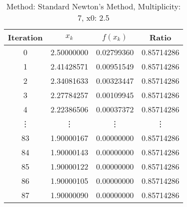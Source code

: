 \begin{table}
\centering
\caption{Method: Standard Newton's Method, Multiplicity: 7, x0: 2.5}
\label{tab:table_Standard_Newton's_Method_7_2_5}
\begin{tabular}{c c c c}
\toprule
Iteration &      $x_k$ &   $f(x_k)$ &      Ratio \\
\midrule
        0 & 2.50000000 & 0.02799360 & 0.85714286 \\
        1 & 2.41428571 & 0.00951549 & 0.85714286 \\
        2 & 2.34081633 & 0.00323447 & 0.85714286 \\
        3 & 2.27784257 & 0.00109945 & 0.85714286 \\
        4 & 2.22386506 & 0.00037372 & 0.85714286 \\
   \vdots &     \vdots &     \vdots &     \vdots \\
       83 & 1.90000167 & 0.00000000 & 0.85714286 \\
       84 & 1.90000143 & 0.00000000 & 0.85714286 \\
       85 & 1.90000122 & 0.00000000 & 0.85714286 \\
       86 & 1.90000105 & 0.00000000 & 0.85714286 \\
       87 & 1.90000090 & 0.00000000 & 0.85714286 \\
\bottomrule
\end{tabular}
\end{table}
